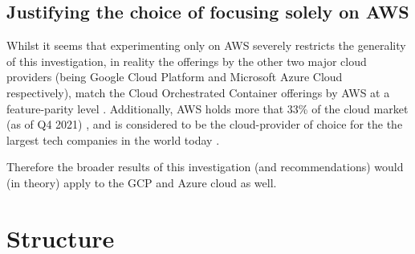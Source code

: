\section{Justifying the choice of focusing solely on AWS}
Whilst it seems that experimenting only on AWS severely restricts the generality of this investigation, in reality the offerings by the other two major cloud providers
(being Google Cloud Platform and Microsoft Azure Cloud respectively), match the Cloud Orchestrated Container offerings by AWS at a feature-parity level \cite{contaier_workloads}.
Additionally, AWS holds more that 33\% of the cloud market (as of Q4 2021) \cite{aws_cloud_share},
and is considered to be the cloud-provider of choice for the the largest tech companies in the world today \cite{aws_users}.

Therefore the broader results of this investigation (and recommendations) would (in theory) apply to the GCP and Azure cloud as well.

\chapter{Structure}
